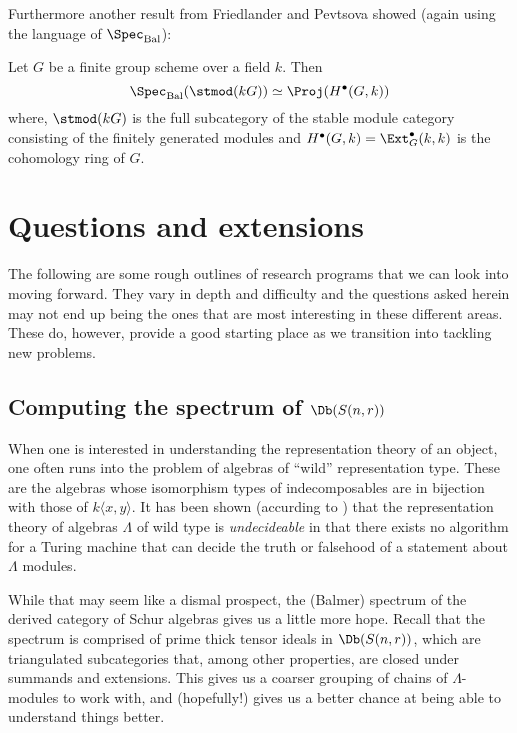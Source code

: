 \documentclass[12pt]{article}
\begin{document}
Furthermore another result from Friedlander and Pevtsova \cite{friedlander-pevtsova-pi} showed (again using 
the language of $\Spec_\text{Bal}$):
\begin{thm}
	Let $G$ be a finite group scheme over a field $k$. Then 
	\[\Spec_\text{Bal}(\stmod(kG))\simeq\Proj(H^\bullet(G,k))\]
	where, $\stmod(kG)$ is the full subcategory of the stable module category consisting of the finitely generated modules and $H^\bullet(G,k)=\Ext_G^\bullet(k,k)$ is the cohomology ring of $G$.
\end{thm}

\newpage
\section{Questions and extensions}
The following are some rough outlines of research programs that we can look into moving forward. They vary in depth and difficulty and the questions 
asked herein may not end up being the ones that are most interesting in these different areas. These do, however, provide a good starting place as we transition 
into tackling new problems.

\subsection{Computing the spectrum of \texorpdfstring{$\Db(S(n,r))$}{DbS(n,r)}}
When one is interested in understanding the representation theory of an object, one often runs into  the problem 
of algebras of ``wild'' representation type. These are the algebras whose isomorphism types of indecomposables are in 
bijection with those of $k\langle x,y\rangle$. It has been shown (accurding to \cite{bensonI}) that the representation 
theory of algebras $\Lambda$ of wild type is \textit{undecideable} in that there exists no algorithm for a Turing machine that can 
decide the truth or falsehood of a statement about $\Lambda$ modules. 

While that may seem like a dismal prospect, the (Balmer) spectrum of the derived category of Schur algebras 
gives us a little more hope. Recall that the spectrum is comprised of prime thick tensor ideals in $\Db(S(n,r))$,
which are triangulated subcategories that, among other properties, are closed under summands and extensions. This gives us a coarser 
grouping of chains of $\Lambda$-modules to work with, and (hopefully!) gives us a better chance at being able to understand 
things better.
\end{document}
